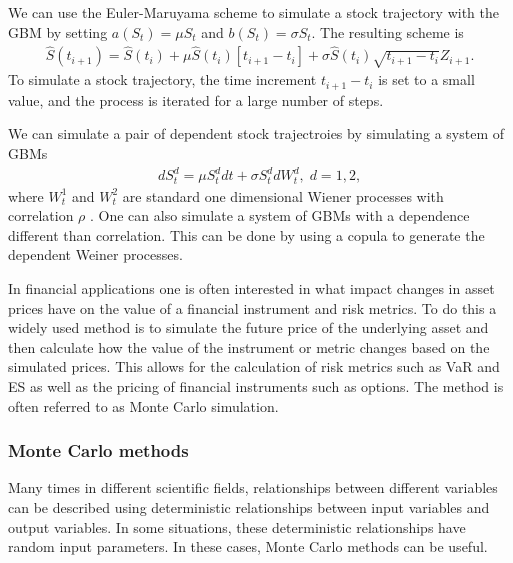We can use the Euler-Maruyama scheme to simulate a stock trajectory with the \gls{GBM} by setting $a(S_t) = \mu S_t$ and $b(S_t) = \sigma S_t$. The resulting scheme is
\begin{align*}
    \hat{S}(t_{i+1}) = \hat{S}(t_i) + \mu \hat{S}(t_i)[t_{i+1}-t_i]  + \sigma \hat{S}(t_i) \sqrt{t_{i+1}-t_i} Z_{i+1}.
\end{align*}
To simulate a stock trajectory, the time increment $t_{i+1}-t_i$ is set to a small value, and the process is iterated for a large number of steps. 

We can simulate a pair of dependent stock trajectroies by simulating a system of \gls{GBM}s  
\begin{align*}
    dS_t^d = \mu S_t^d dt + \sigma S_t^d dW_t^d, \; d=1,2, 
\end{align*}
where $W_t^1$ and $W_t^2$ are standard one dimensional Wiener processes with correlation $\rho$ . One can also simulate a system of \gls{GBM}s with a dependence different than correlation. This can be done by using a copula to generate the dependent Weiner processes.

In financial applications one is often interested in what impact changes in asset prices have on the value of a financial instrument and risk metrics. To do this a widely used method is to simulate the future price of the underlying asset and then calculate how the value of the instrument or metric changes based on the simulated prices. This allows for the calculation of risk metrics such as \gls{VaR} and \gls{ES} as well as the pricing of financial instruments such as options. The method is often referred to as Monte Carlo simulation.  

\subsubsection{Monte Carlo methods} \label{sec:MonteCarlo}
Many times in different scientific fields, relationships between different variables can be described using deterministic relationships between input variables and output variables. In some situations, these deterministic relationships have random input parameters. In these cases, Monte Carlo methods can be useful. 

